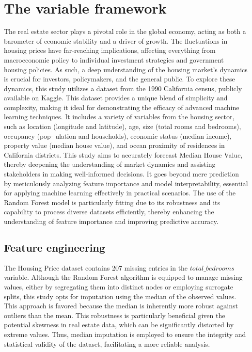 \documentclass[12pt]{article}
\begin{document}
\section{The variable framework}
The real estate sector plays a pivotal role in the global economy, acting as both a barometer of economic stability and a driver of growth. The fluctuations in housing prices have far-reaching implications, affecting everything from macroeconomic policy to individual investment strategies and government housing policies. As such, a deep understanding of the housing market's dynamics is crucial for investors, policymakers, and the general public.
To explore these dynamics, this study utilizes a dataset from the 1990 California census, publicly available on Kaggle. This dataset provides a unique blend of simplicity and complexity, making it ideal for demonstrating the efficacy of advanced machine learning techniques.
 It includes a variety of variables from the housing sector, such as location (longitude and latitude), age, size (total rooms and bedrooms), occupancy (pop- ulation and households), economic status (median income), property value (median house value), and ocean proximity of residences in California districts.
This study aims to accurately forecast Median House Value, thereby deepening the understanding of market dynamics and assisting stakeholders in making well-informed decisions. It goes beyond mere prediction by meticulously analyzing feature importance and model interpretability, essential for applying machine learning effectively in practical scenarios.
The use of the Random Forest model is particularly fitting due to its robustness and its capability to process diverse datasets efficiently, thereby enhancing the understanding of feature importance and improving predictive accuracy.

\subsection{Feature engineering}
The Housing Price dataset contains 207 missing entries in the $total\_bedrooms$ variable. Although the Random Forest algorithm is equipped to manage missing values, either by segregating them into distinct nodes or employing surrogate splits, this study opts for imputation using the median of the observed values. This approach is favored because the median is inherently more robust against outliers than the mean. This robustness is particularly beneficial given the potential skewness in real estate data, which can be significantly distorted by extreme values. Thus, median imputation is employed to ensure the integrity and statistical validity of the dataset, facilitating a more reliable analysis.
\end{document}
